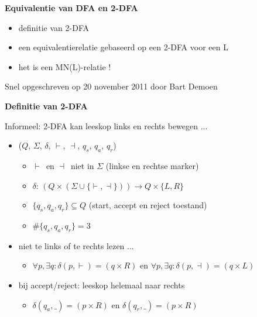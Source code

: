 \documentclass{seminar}
\newcommand{\beginm}{\vdash }
\newcommand{\eindm}{\dashv }
\begin{document}
\begin{slide}

{\bf Equivalentie van DFA en 2-DFA}

\begin{itemize}
\item 
definitie van 2-DFA

\item 
een equivalentierelatie gebaseerd op een 2-DFA voor een L

\item
het is een MN(L)-relatie !


\end{itemize}

Snel opgeschreven op 20 november 2011 door Bart Demoen

\end{slide}  

\begin{slide}

{\bf Definitie van 2-DFA}

Informeel: 2-DFA kan leeskop links en rechts bewegen ...

\begin{itemize}
\item 
($Q$, $\Sigma$, $\delta$, $\beginm$, $\eindm$, $q_s$, $q_a$, $q_r$)
\begin{itemize}
\item 
$\beginm$~en $\eindm$~niet in $\Sigma$ (linkse en rechtse marker)

\item 
$\delta$:
$(Q \times (\Sigma \cup \{\beginm, \eindm\})) \rightarrow Q \times\{L,R\}$



\item 
$\{q_s, q_a, q_r\} \subseteq Q$ (start, accept en reject toestand)
\item
$\#\{q_s, q_a, q_r\} = 3$

\end{itemize}


\item 
niet te links of te rechts lezen ...
\begin{itemize}
\item 
$\forall p, \exists q: \delta(p, \beginm) = (q \times R)$
en
$\forall p, \exists q: \delta(p, \eindm) = (q \times L)$

\end{itemize}


\item 
bij accept/reject: leeskop helemaal naar rechts
\begin{itemize}
\item 
$\delta(q_a, \_) = (p \times R)$ en $\delta(q_r, \_) = (p \times R)$

\end{itemize}


\end{itemize}

\end{slide} 
\end{document}

